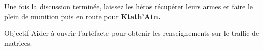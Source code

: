 \bigbreak

Une fois la discussion terminée, laissez les héros récupérer leurs armes et faire le plein de munition puis en route pour \textbf{Ktath’Atn.}

\begin{paperbox}{Objectif}
Aider  à ouvrir l’artéfacte pour obtenir les renseignements sur le traffic de matrices.
\end{paperbox}